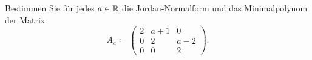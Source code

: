 \documentclass[a4paper, 10pt]{scrartcl}
\begin{document}
\begin{question}
  Bestimmen Sie für jedes $a \in \mathbb{R}$ die Jordan-Normalform und das Minimalpolynom der Matrix
  \[
              A_a
    \coloneqq \begin{pmatrix}
                2 & a+1 &  0  \\
                0 &  2  & a-2 \\
                0 &  0  &  2
              \end{pmatrix}.
  \]
\end{question}











\end{document}
